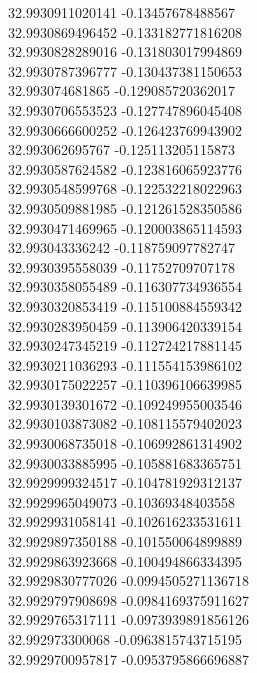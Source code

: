 {32.9930911020141	-0.13457678488567\\
32.9930869496452	-0.133182771816208\\
32.9930828289016	-0.131803017994869\\
32.9930787396777	-0.130437381150653\\
32.993074681865	-0.129085720362017\\
32.9930706553523	-0.127747896045408\\
32.9930666600252	-0.126423769943902\\
32.993062695767	-0.125113205115873\\
32.9930587624582	-0.123816065923776\\
32.9930548599768	-0.122532218022963\\
32.9930509881985	-0.121261528350586\\
32.9930471469965	-0.120003865114593\\
32.993043336242	-0.118759097782747\\
32.9930395558039	-0.11752709707178\\
32.9930358055489	-0.116307734936554\\
32.9930320853419	-0.115100884559342\\
32.9930283950459	-0.113906420339154\\
32.9930247345219	-0.112724217881145\\
32.9930211036293	-0.111554153986102\\
32.9930175022257	-0.110396106639985\\
32.9930139301672	-0.109249955003546\\
32.9930103873082	-0.108115579402023\\
32.9930068735018	-0.106992861314902\\
32.9930033885995	-0.105881683365751\\
32.9929999324517	-0.104781929312137\\
32.9929965049073	-0.10369348403558\\
32.9929931058141	-0.102616233531611\\
32.9929897350188	-0.101550064899889\\
32.9929863923668	-0.100494866334395\\
32.9929830777026	-0.0994505271136718\\
32.9929797908698	-0.0984169375911627\\
32.9929765317111	-0.0973939891856126\\
32.992973300068	-0.0963815743715195\\
32.9929700957817	-0.0953795866696887\\
}
